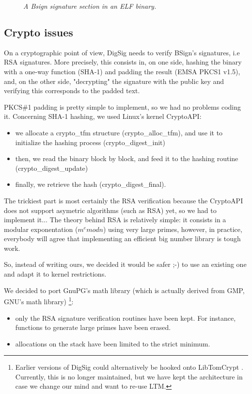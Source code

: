 \documentclass{article}
\begin{document}
\begin{figure}[htb]
\begin{center}
\epsfxsize=12cm 
\caption{{\it A Bsign signature section in an ELF binary. }}
\label{fig2}
\end{center}
\end{figure}


\subsection{Crypto issues}

On a cryptographic point of view, DigSig needs to verify 
BSign's signatures, i.e RSA signatures. More precisely, this 
consists in, on one side, hashing the binary
with a one-way function (SHA-1) and padding the result (EMSA PKCS1 v1.5), and,
on the other side, "decrypting" the signature with the public key
and verifying this corresponds to the padded text.

PKCS\#1 padding is pretty simple to implement, so we had no problems
coding it. Concerning SHA-1 hashing, we used Linux's kernel CryptoAPI:

\begin{itemize} 
\item we allocate a crypto\_tfm structure (crypto\_alloc\_tfm), and use
  it to initialize the hashing process (crypto\_digest\_init)

\item then, we read the binary block by block, and feed it to the hashing
  routine (crypto\_digest\_update)

\item finally, we retrieve the hash (crypto\_digest\_final).
\end{itemize} 

The trickiest part is most certainly the RSA verification because
the CryptoAPI does not support asymetric algorithms (such as RSA) yet,
so we had to implement it... The theory behind RSA is relatively
simple: it consists in a modular exponentation ($m^e mod n$) using
very large primes, however, in practice, everybody will agree that 
implementing an efficient big number library is tough work. 

So, instead of writing ours, we decided it would be safer ;-) to use
an existing one and adapt it to kernel restrictions.

We decided to port GnuPG's math library (which is
actually derived from GMP, GNU's math library) \cite{GnuPG}\footnote{Earlier versions of 
DigSig could alternatively be hooked onto LibTomCrypt \cite{ltm}. Currently, this is no longer
maintained, but we have kept the architecture in case we change our mind and want to re-use LTM.}:
\begin{itemize} 
\item only the RSA signature verification routines have been kept. 
  For instance, functions to generate large primes have been erased.
\item allocations on the stack have been limited to the strict minimum.
\end{itemize} 
\end{document}
